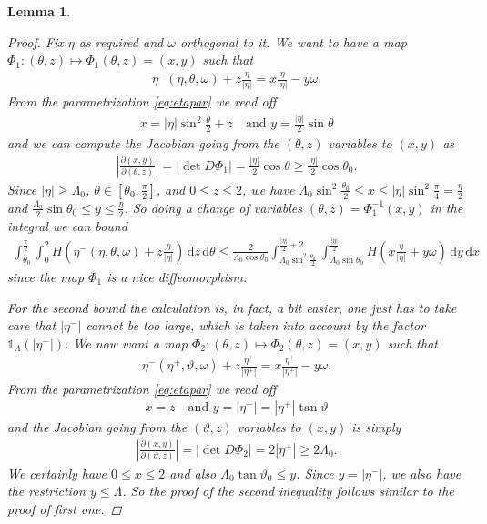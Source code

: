 \documentclass[11pt,a4paper,reqno]{amsart}
\theoremstyle{plain}
\newtheorem{lemma}[proposition]{Lemma}
\theoremstyle{definition}
\begin{document}
\begin{lemma}
\begin{proof}
	Fix $\eta$ as required and $\omega$ orthogonal to it. We want to have a map $\Phi_1:(\theta,z)\mapsto \Phi_1(\theta,z)=(x,y)$ such that
	\begin{align*}
		\eta^-(\eta,\theta,\omega)+z\tfrac{\eta}{|\eta|}
		=
		 x\tfrac{\eta}{|\eta|} - y\omega .
	\end{align*}
	From the parametrization \eqref{eq:etapar} we read off
	\begin{align*}
		x = |\eta|\sin^2\frac{\theta}{2} + z
		\quad\text{and }
		y = \frac{|\eta|}{2}\sin\theta
	\end{align*}
	and we can compute the Jacobian going from the $(\theta,z)$ variables to $(x,y)$ as
	\begin{align*}
		\left|\frac{\partial(x,y)}{\partial(\theta,z)}\right| = |\det D\Phi_1| = \frac{|\eta|}{2}\cos\theta\ge \frac{|\eta|}{2}\cos\theta_0 .
	\end{align*}
	Since $|\eta|\ge \Lambda_0$, $\theta\in [\theta_0,\tfrac{\pi}{2}]$, and $0\le z\le 2$, we have
	$\Lambda_0\sin^2\tfrac{\theta_0}{2}\le x\le |\eta|\sin^2\tfrac{\pi}{4} = \tfrac{\eta}{2} $
	and $\frac{\Lambda_0}{2}\sin\theta_0 \le y\le \tfrac{\eta}{2}$.
	So doing a change of variables $(\theta,z)= \Phi_1^{-1}(x,y)$ in the integral we can bound
	\begin{align*}
		\int_{\theta_0}^{\tfrac{\pi}{2}} \int_0^2 H\left(\eta^-(\eta,\theta,\omega)+z\tfrac{\eta}{|\eta|}\right) \,\mathrm{d} z\, \mathrm{d}\theta
	\le \frac{2}{\Lambda_0\cos\theta_0}
		\int_{\Lambda_0\sin^2\tfrac{\theta_0}{2}}^{\tfrac{|\eta|}{2}+2}
		\int_{\Lambda_0\sin\theta_0}^{\tfrac{|\eta|}{2}}
			H\left(x\tfrac{\eta}{|\eta|} + y\omega\right)
			\,\mathrm{d} y\, \mathrm{d}x
	\end{align*}
	since the map $\Phi_1$ is a nice diffeomorphism.
	
	For the second bound the calculation is, in fact, a bit easier, one just has to take care that $|\eta^-|$ cannot be too large, which is taken into account by the factor
	${\mathds{1}}_\Lambda(|\eta^-|)$.  We now want a map $\Phi_2:(\theta,z)\mapsto \Phi_2(\theta,z)=(x,y)$ such that
	\begin{align*}
		\eta^-(\eta^+,\vartheta,\omega)+z\tfrac{\eta^+}{|\eta^+|}
		=
		 x\tfrac{\eta^+}{|\eta^+|} - y\omega .
	\end{align*}
	From the parametrization \eqref{eq:etapar} we read off
	\begin{align*}
		x =  z
		\quad\text{and }
		y = |\eta^-|=|\eta^+|\tan\vartheta
	\end{align*}
 and the Jacobian going from the $(\vartheta,z)$ variables to $(x,y)$ is simply
	\begin{align*}
		\left|\frac{\partial(x,y)}{\partial(\vartheta,z)}\right| = |\det D\Phi_2|
		= 2|\eta^+| \ge 2\Lambda_0.
	\end{align*}
	We certainly have $0\le x\le 2$ and also $\Lambda_0\tan\vartheta_0\le y$. Since
	$y= |\eta^-|$, we also have the restriction $y\le \Lambda$. So the proof of the second inequality follows similar to the proof of first one.
\end{proof}


\end{lemma}
\end{document}

